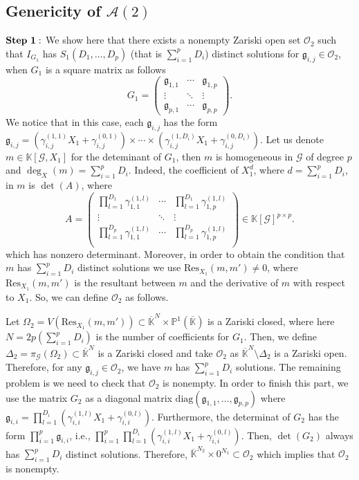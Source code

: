 \documentclass[11pt]{article}
\numberwithin{Property}{section}
\numberwithin{Theorem}{section}
\numberwithin{Proposition}{section}
\numberwithin{Lemma}{section}
\numberwithin{Corollary}{section}
\numberwithin{Definition}{section}
\numberwithin{Remark}{section}
\numberwithin{Conjecture}{section}
\numberwithin{Problem}{section}
\numberwithin{Claim}{section}
\theoremstyle{definition}
\numberwithin{Example}{section}
\def\bar{\overline}
\newcommand{\field}{\mathbb{K}} %
\begin{document}
\subsection{Genericity of $\mathcal{A}(2)$}
$\bf{Step \ 1:}$ We show here that there exists a nonempty Zariski open set $\mathcal{O}_2$ such that $I_{G_1}$ has $S_1(D_1, \ldots, D_p)$ (that is $\sum_{i=1}^pD_i$) distinct solutions for $\mathfrak{g}_{i,j} \in \mathcal{O}_2$, when $G_1$ is a square matrix as follows
\[
G_1 = \left( \begin{matrix}
\mathfrak{g}_{1,1}  & \cdots  & \mathfrak{g}_{1, p}\\
\vdots & \ddots & \vdots \\
\mathfrak{g}_{p,1} & \cdots  & \mathfrak{g}_{p, p}
\end{matrix} \right).
\] We notice that in this case, each $\mathfrak{g}_{i,j}$ has the form $\mathfrak{g}_{i,j} = (\gamma_{i,j}^{(1,1)}X_1 + \gamma_{i,j}^{(0,1)}) \times \cdots \times (\gamma_{i,j}^{(1,D_i)}X_1 + \gamma_{i,j}^{(0,D_i)})$. Let us denote $m \in \field[\mathcal{G}, X_1]$ for the deteminant of $G_1$, then $m$ is homogeneous in $\mathcal{G}$ of degree $p$ and $\deg_X(m) = \sum_{i=1}^pD_i$. Indeed, the coefficient of $X_1^{d}$, where $d = \sum_{i=1}^pD_i$, in $m$ is $\det(A)$, where 
\[
A = \left( \begin{matrix}
\prod_{l=1}^{D_1}\gamma_{1,1}^{(1,l)}  & \cdots  & \prod_{l=1}^{D_1}\gamma_{1,p}^{(1,l)}\\
\vdots & \ddots & \vdots \\
\prod_{l=1}^{D_p}\gamma_{1,1}^{(1,l)}  & \cdots  & \prod_{l=1}^{D_p}\gamma_{1,p}^{(1,l)}\\
\end{matrix} \right) \in \field[\mathcal{G}]^{p \times p}.
\] which has nonzero determinant. Moreover, in order to obtain the condition that $m$ has $\sum_{i=1}^pD_i$ distinct solutions we use $\mathrm{Res}_{X_1}(m, m') \ne 0$, where $\mathrm{Res}_{X_1}(m, m')$ is the resultant between $m$ and the derivative of $m$ with respect to $X_1$. So, we can define $\mathcal{O}_2$ as follows. 

Let $\Omega_2 = V(\mathrm{Res}_{X_1}(m, m')) \subset \bar{\field}^{N} \times \mathbb{P}^1(\bar{\field})$ is a Zariski closed, where here $N = 2p(\sum_{i=1}^pD_i)$ is the number of coefficients for $G_1$. Then, we define $\Delta_2 = \pi_{\mathcal{G}}(\Omega_2) \subset \bar{\field}^{N}$ is a Zariski closed and take $\mathcal{O}_2$ as $\bar{\field}^{N} \setminus \Delta_2$ is a Zariski open. Therefore, for any $\mathfrak{g}_{i,j} \in \mathcal{O}_2$, we have $m$ has $\sum_{i=1}^pD_i$ solutions. The remaining problem is we need to check that $\mathcal{O}_2$ is nonempty. In order to finish this part, we use the matrix $G_2$ as a diagonal matrix $\mathrm{diag}(\mathfrak{g}_{1,1}, \ldots, \mathfrak{g}_{p,p})$ where $\mathfrak{g}_{i,i} = \prod_{l=1}^{D_i}(\gamma_{i,i}^{(1,l)}X_1 + \gamma_{i,i}^{(0,l)})$. Furthermore, the determinat of $G_2$ has the form $\prod_{i=1}^p\mathfrak{g}_{i,i}$, i.e., $\prod_{i=1}^p\prod_{l=1}^{D_i}(\gamma_{i,i}^{(1,l)}X_1 + \gamma_{i,i}^{(0,l)})$. Then, $\det(G_2)$ always has $\sum_{i=1}^pD_i$  distinct solutions. Therefore, $\bar{\field}^{N_2} \times 0^{N_1} \subset \mathcal{O}_2$ which implies that $\mathcal{O}_2$ is nonempty. 
\end{document}
